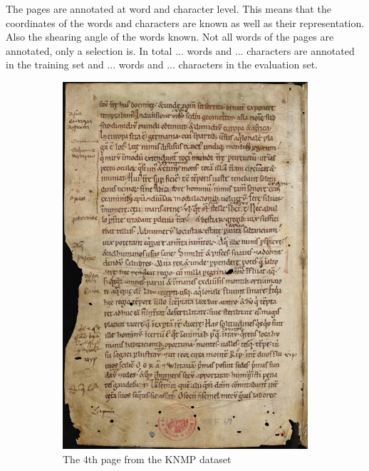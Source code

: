 \documentclass[11pt,a4paper]{article}
\begin{document}
The pages are annotated at word and character level. This means that the coordinates of the words and characters are known as well as their representation. Also the shearing angle of the words known. Not all words of the pages are annotated, only a selection is. In total ... words and ... characters are annotated in the training set and ... words and ... characters in the evaluation set. 
\begin{figure}[hbt]
\centering
\begin{subfigure}[b]{0.4\textwidth}
	\includegraphics[width=\textwidth]{figures/KNMP4}
	\caption{The 4th page from the KNMP dataset}
\end{subfigure}
\quad
\begin{subfigure}[b]{0.4\textwidth}

\end{subfigure}
\end{figure}
\end{document}
